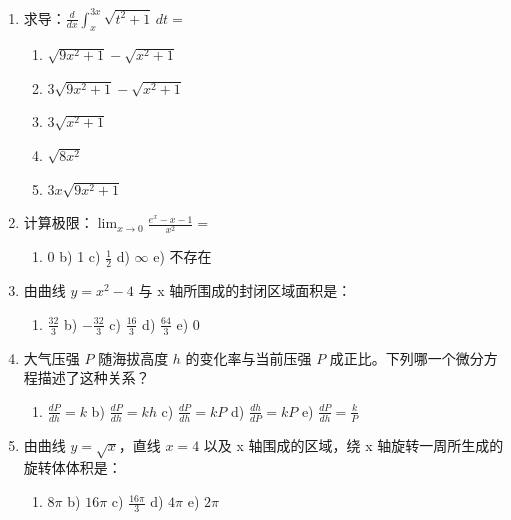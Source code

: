 \documentclass[12pt,a4paper]{article}
\begin{document}
\begin{enumerate}[label=\arabic*), itemsep=15pt, start=16]
    \item 求导：$\frac{d}{dx} \int_{x}^{3x} \sqrt{t^2 + 1} \, dt =$
    \begin{enumerate}[label=\alph*), itemsep=0pt]
        \item $\sqrt{9x^2+1} - \sqrt{x^2+1}$ 
        \item $3\sqrt{9x^2+1} - \sqrt{x^2+1}$ 
        \item $3\sqrt{x^2+1}$
        \item $\sqrt{8x^2}$
        \item $3x\sqrt{9x^2+1}$
    \end{enumerate}

    \item 计算极限：$\lim_{x\rightarrow 0} \frac{e^x - x - 1}{x^2} =$
    \begin{enumerate}[label=\alph*), itemsep=0pt]
        \item 0 \quad b) 1 \quad c) $\frac{1}{2}$ \quad d) $\infty$ \quad e) 不存在
    \end{enumerate}

    \item 由曲线 $y = x^2 - 4$ 与 x 轴所围成的封闭区域面积是：
    \begin{enumerate}[label=\alph*), itemsep=0pt]
        \item $\frac{32}{3}$ \quad b) $-\frac{32}{3}$ \quad c) $\frac{16}{3}$ \quad d) $\frac{64}{3}$ \quad e) 0
    \end{enumerate}

    \item 大气压强 $P$ 随海拔高度 $h$ 的变化率与当前压强 $P$ 成正比。下列哪一个微分方程描述了这种关系？
    \begin{enumerate}[label=\alph*), itemsep=0pt]
        \item $\frac{dP}{dh} = k$ \quad b) $\frac{dP}{dh} = kh$ \quad c) $\frac{dP}{dh} = kP$ \quad d) $\frac{dh}{dP} = kP$ \quad e) $\frac{dP}{dh} = \frac{k}{P}$
    \end{enumerate}

    \item 由曲线 $y = \sqrt{x}$，直线 $x=4$ 以及 x 轴围成的区域，绕 x 轴旋转一周所生成的旋转体体积是：
    \begin{enumerate}[label=\alph*), itemsep=0pt]
        \item $8\pi$ \quad b) $16\pi$ \quad c) $\frac{16\pi}{3}$ \quad d) $4\pi$ \quad e) $2\pi$
    \end{enumerate}

\end{enumerate}
\end{document}
